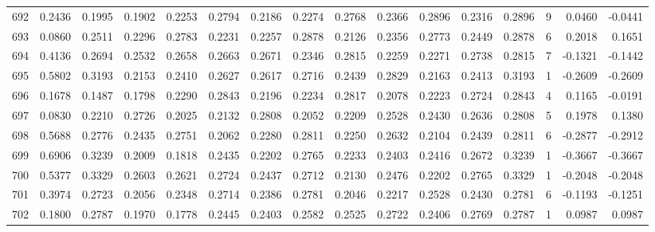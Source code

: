 \begin{tabular}{lrrrrrrrrrrrrrrr}
692 &      0.2436 &  0.1995 &  0.1902 &  0.2253 &  0.2794 &  0.2186 &  0.2274 &  0.2768 &  0.2366 &  0.2896 &   0.2316 &     0.2896 &      9 &                    0.0460 &                    -0.0441 \\
693 &      0.0860 &  0.2511 &  0.2296 &  0.2783 &  0.2231 &  0.2257 &  0.2878 &  0.2126 &  0.2356 &  0.2773 &   0.2449 &     0.2878 &      6 &                    0.2018 &                     0.1651 \\
694 &      0.4136 &  0.2694 &  0.2532 &  0.2658 &  0.2663 &  0.2671 &  0.2346 &  0.2815 &  0.2259 &  0.2271 &   0.2738 &     0.2815 &      7 &                   -0.1321 &                    -0.1442 \\
695 &      0.5802 &  0.3193 &  0.2153 &  0.2410 &  0.2627 &  0.2617 &  0.2716 &  0.2439 &  0.2829 &  0.2163 &   0.2413 &     0.3193 &      1 &                   -0.2609 &                    -0.2609 \\
696 &      0.1678 &  0.1487 &  0.1798 &  0.2290 &  0.2843 &  0.2196 &  0.2234 &  0.2817 &  0.2078 &  0.2223 &   0.2724 &     0.2843 &      4 &                    0.1165 &                    -0.0191 \\
697 &      0.0830 &  0.2210 &  0.2726 &  0.2025 &  0.2132 &  0.2808 &  0.2052 &  0.2209 &  0.2528 &  0.2430 &   0.2636 &     0.2808 &      5 &                    0.1978 &                     0.1380 \\
698 &      0.5688 &  0.2776 &  0.2435 &  0.2751 &  0.2062 &  0.2280 &  0.2811 &  0.2250 &  0.2632 &  0.2104 &   0.2439 &     0.2811 &      6 &                   -0.2877 &                    -0.2912 \\
699 &      0.6906 &  0.3239 &  0.2009 &  0.1818 &  0.2435 &  0.2202 &  0.2765 &  0.2233 &  0.2403 &  0.2416 &   0.2672 &     0.3239 &      1 &                   -0.3667 &                    -0.3667 \\
700 &      0.5377 &  0.3329 &  0.2603 &  0.2621 &  0.2724 &  0.2437 &  0.2712 &  0.2130 &  0.2476 &  0.2202 &   0.2765 &     0.3329 &      1 &                   -0.2048 &                    -0.2048 \\
701 &      0.3974 &  0.2723 &  0.2056 &  0.2348 &  0.2714 &  0.2386 &  0.2781 &  0.2046 &  0.2217 &  0.2528 &   0.2430 &     0.2781 &      6 &                   -0.1193 &                    -0.1251 \\
702 &      0.1800 &  0.2787 &  0.1970 &  0.1778 &  0.2445 &  0.2403 &  0.2582 &  0.2525 &  0.2722 &  0.2406 &   0.2769 &     0.2787 &      1 &                    0.0987 &                     0.0987 \\

\end{tabular}
